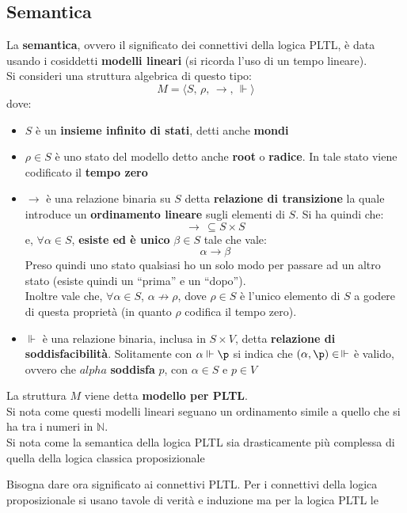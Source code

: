 \documentclass[a4paper,12pt, oneside]{book}
\begin{document}
\subsection{Semantica}
\begin{definizione}
  La \textbf{semantica}, ovvero il significato dei connettivi della logica PLTL,
  è data usando i cosiddetti \textbf{modelli lineari} (si ricorda l'uso di un
  tempo lineare).\\
  Si consideri una struttura algebrica di questo tipo:
  \[M=\langle S,\,\rho, \,\to, \,\Vdash\rangle\]
  dove:
  \begin{itemize}
    \item $S$ è un \textbf{insieme infinito di stati}, detti anche
    \textbf{mondi}
    \item $\rho \in S$ è uno stato del modello detto anche \textbf{root} o
    \textbf{radice}. In tale stato viene codificato il \textbf{tempo zero}
    \item $\to$ è una relazione binaria su $S$ detta \textbf{relazione di
      transizione} la quale introduce un \textbf{ordinamento lineare} sugli
    elementi di $S$. Si ha quindi che:
    \[\to\,\subseteq S\times S\]
    e, $\forall \alpha \in S$, \textbf{esiste ed è unico} $\beta\in S$ tale che
    vale:
    \[\alpha\to\beta\]
    Preso quindi uno stato qualsiasi ho un solo modo per passare ad un altro
    stato (esiste quindi un ``prima'' e un ``dopo'').\\
    Inoltre vale che, $\forall \alpha\in S$, $\alpha\not\to \rho$, dove $\rho\in
    S$ è l'unico elemento di $S$ a godere di questa proprietà (in quanto $\rho$
    codifica il tempo zero). 
    \item $\Vdash$ è una relazione binaria, inclusa in $S\times V$, detta
    \textbf{relazione di soddisfacibilità}. Solitamente con $\alpha\Vdash\p$
    si indica che $(\alpha,\p)\in\,\Vdash$ è valido, ovvero che $alpha$
    \textbf{soddisfa} $p$, con $\alpha\in S$ e $p\in V$
  \end{itemize}
  La struttura $M$ viene detta \textbf{modello per PLTL}.\\
  Si nota come questi modelli lineari seguano un ordinamento simile a quello che
  si ha tra i numeri in $\mathbb{N}$.\\ 
  Si nota come la semantica della logica PLTL sia drasticamente più complessa
  di quella della logica classica proposizionale 
\end{definizione}
\newpage
Bisogna dare ora significato ai connettivi PLTL. Per i connettivi della logica
proposizionale si usano tavole di verità e induzione ma per la logica PLTL le
\end{document}
